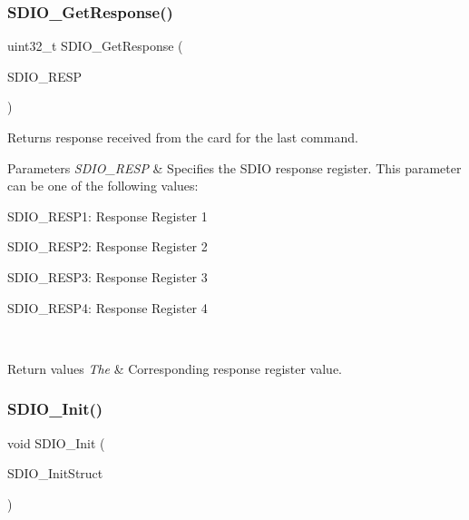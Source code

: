 \subsubsection{\texorpdfstring{SDIO\_GetResponse()}{SDIO\_GetResponse()}}
{\footnotesize\ttfamily uint32\+\_\+t S\+D\+I\+O\+\_\+\+Get\+Response (\begin{DoxyParamCaption}\item[{uint32\+\_\+t}]{S\+D\+I\+O\+\_\+\+R\+E\+SP }\end{DoxyParamCaption})}



Returns response received from the card for the last command. 


\begin{DoxyParams}{Parameters}
{\em S\+D\+I\+O\+\_\+\+R\+E\+SP} & Specifies the S\+D\+IO response register. This parameter can be one of the following values\+: \begin{DoxyItemize}
\item S\+D\+I\+O\+\_\+\+R\+E\+S\+P1\+: Response Register 1 \item S\+D\+I\+O\+\_\+\+R\+E\+S\+P2\+: Response Register 2 \item S\+D\+I\+O\+\_\+\+R\+E\+S\+P3\+: Response Register 3 \item S\+D\+I\+O\+\_\+\+R\+E\+S\+P4\+: Response Register 4 \end{DoxyItemize}
\\
\hline
\end{DoxyParams}

\begin{DoxyRetVals}{Return values}
{\em The} & Corresponding response register value. \\
\hline
\end{DoxyRetVals}
\mbox{\label{group___s_d_i_o___exported___functions_gad40764a8e37c0ed5c9141ae338ff0203}} 
\subsubsection{\texorpdfstring{SDIO\_Init()}{SDIO\_Init()}}
{\footnotesize\ttfamily void S\+D\+I\+O\+\_\+\+Init (\begin{DoxyParamCaption}\item[{\mbox{\hyperlink{struct_s_d_i_o___init_type_def}{S\+D\+I\+O\+\_\+\+Init\+Type\+Def}} $\ast$}]{S\+D\+I\+O\+\_\+\+Init\+Struct }\end{DoxyParamCaption})}



